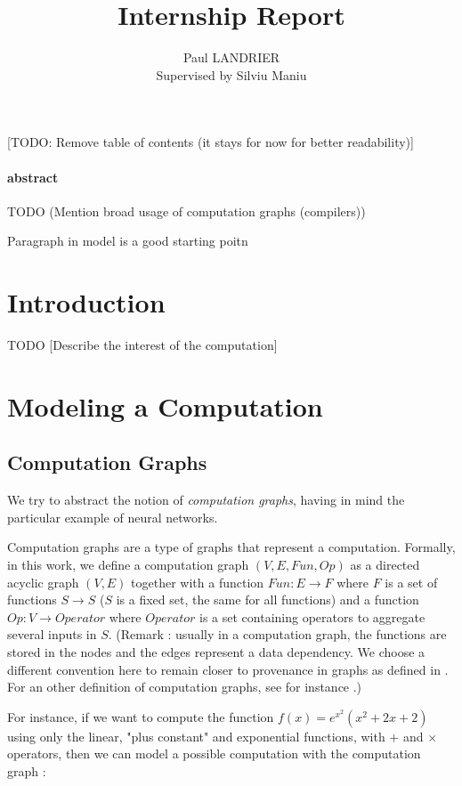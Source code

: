 \documentclass[11pt,a4paper]{article}
\author{Paul LANDRIER \\ Supervised by Silviu Maniu}
\title{Internship Report}
\date{}
\theoremstyle{definition}
\begin{document}
\maketitle

\tableofcontents

[TODO: Remove table of contents (it stays for now for better readability)]

\paragraph{abstract} TODO (Mention broad usage of computation graphs (compilers))

Paragraph in model is a good starting poitn

\section{Introduction}

TODO [Describe the interest of the computation]

\section{Modeling a Computation}

\subsection{Computation Graphs}

We try to abstract the notion of \textit{computation graphs}, having in mind the particular example of neural networks.

	Computation graphs are a type of graphs that represent a computation. Formally, in this work, we define a computation graph $(V,E,Fun,Op)$ as a directed acyclic graph $(V,E)$ together with a function $Fun:E \to F$ where $F$ is a set of functions $S \to S$ ($S$ is a fixed set, the same for all functions) and a function $Op:V \to Operator$ where $Operator$ is a set containing operators to aggregate several inputs in $S$. (Remark : usually in a computation graph, the functions are stored in the nodes and the edges represent a data dependency. We choose a different convention here to remain closer to provenance in graphs as defined in . For an other definition of computation graphs, see for instance .)
	
	For instance, if we want to compute the function $f(x)=e^{x^2}(x^2 + 2x + 2)$ using only the linear, "plus constant" and exponential functions, with $+$ and $\times$ operators, then we can model a possible computation with the computation graph :
	
\end{document}
